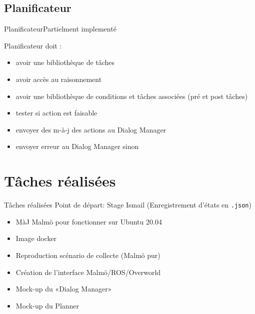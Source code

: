 \documentclass[aspectratio=169]{audition-beamer}
\begin{document}
\subsection{Planificateur}
\begin{frame}{Planificateur}{Partielment implementé }

  \pause
  Planificateur doit :
  \begin{itemize}[<+(1)->]
    \item[\only<9->{\checkmark}] avoir une bibliothèque de tâches
    \item[\only<9->{-- }] avoir accès au raisonnement
    \item[] avoir une bibliothèque de conditions et tâches associées (pré et post tâches)
    \item[] tester si action est faisable
    \item[\only<9->{\checkmark}] envoyer des m-à-j des actions au Dialog Manager
    \item[\only<9->{\checkmark}] envoyer erreur au Dialog Manager sinon
  \end{itemize}
\end{frame}


\section{Tâches réalisées}
\begin{frame}{Tâches réalisées}
  \pause
  \vfill
Point de départ: Stage Ismail (Enregistrement d'états en \texttt{.json})
  \vfill
\begin{itemize}[<+(1)->]
  \item MàJ Malmö pour fonctionner sur Ubuntu 20.04
  \item Image docker
  \item Reproduction scénario de collecte (Malmö pur)
  \item Création de l'interface Malmö/ROS/Overworld
  \item Mock-up du «Dialog Manager» 
  \item Mock-up du Planner 
\end{itemize}

\end{frame}
\end{document}
